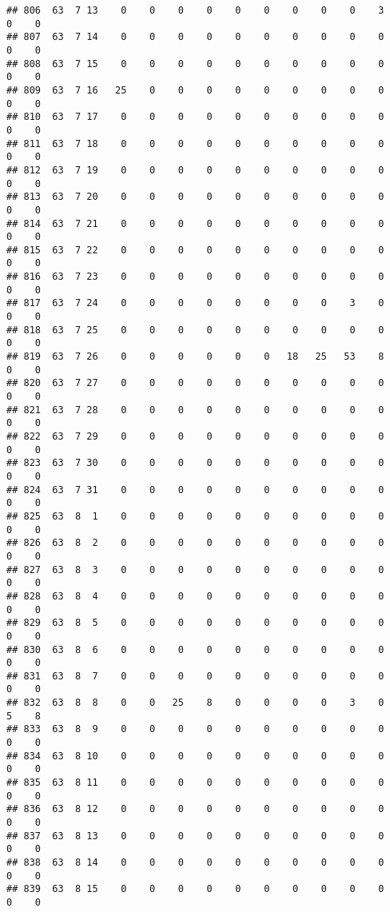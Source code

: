\documentclass[]{article}
\begin{document}
\begin{verbatim}
## 806  63  7 13    0    0    0    0    0    0    0    0    0    3    0    0
## 807  63  7 14    0    0    0    0    0    0    0    0    0    0    0    0
## 808  63  7 15    0    0    0    0    0    0    0    0    0    0    0    0
## 809  63  7 16   25    0    0    0    0    0    0    0    0    0    0    0
## 810  63  7 17    0    0    0    0    0    0    0    0    0    0    0    0
## 811  63  7 18    0    0    0    0    0    0    0    0    0    0    0    0
## 812  63  7 19    0    0    0    0    0    0    0    0    0    0    0    0
## 813  63  7 20    0    0    0    0    0    0    0    0    0    0    0    0
## 814  63  7 21    0    0    0    0    0    0    0    0    0    0    0    0
## 815  63  7 22    0    0    0    0    0    0    0    0    0    0    0    0
## 816  63  7 23    0    0    0    0    0    0    0    0    0    0    0    0
## 817  63  7 24    0    0    0    0    0    0    0    0    3    0    0    0
## 818  63  7 25    0    0    0    0    0    0    0    0    0    0    0    0
## 819  63  7 26    0    0    0    0    0    0   18   25   53    8    0    0
## 820  63  7 27    0    0    0    0    0    0    0    0    0    0    0    0
## 821  63  7 28    0    0    0    0    0    0    0    0    0    0    0    0
## 822  63  7 29    0    0    0    0    0    0    0    0    0    0    0    0
## 823  63  7 30    0    0    0    0    0    0    0    0    0    0    0    0
## 824  63  7 31    0    0    0    0    0    0    0    0    0    0    0    0
## 825  63  8  1    0    0    0    0    0    0    0    0    0    0    0    0
## 826  63  8  2    0    0    0    0    0    0    0    0    0    0    0    0
## 827  63  8  3    0    0    0    0    0    0    0    0    0    0    0    0
## 828  63  8  4    0    0    0    0    0    0    0    0    0    0    0    0
## 829  63  8  5    0    0    0    0    0    0    0    0    0    0    0    0
## 830  63  8  6    0    0    0    0    0    0    0    0    0    0    0    0
## 831  63  8  7    0    0    0    0    0    0    0    0    0    0    0    0
## 832  63  8  8    0    0   25    8    0    0    0    0    3    0    5    8
## 833  63  8  9    0    0    0    0    0    0    0    0    0    0    0    0
## 834  63  8 10    0    0    0    0    0    0    0    0    0    0    0    0
## 835  63  8 11    0    0    0    0    0    0    0    0    0    0    0    0
## 836  63  8 12    0    0    0    0    0    0    0    0    0    0    0    0
## 837  63  8 13    0    0    0    0    0    0    0    0    0    0    0    0
## 838  63  8 14    0    0    0    0    0    0    0    0    0    0    0    0
## 839  63  8 15    0    0    0    0    0    0    0    0    0    0    0    0

\end{verbatim}
\end{document}
